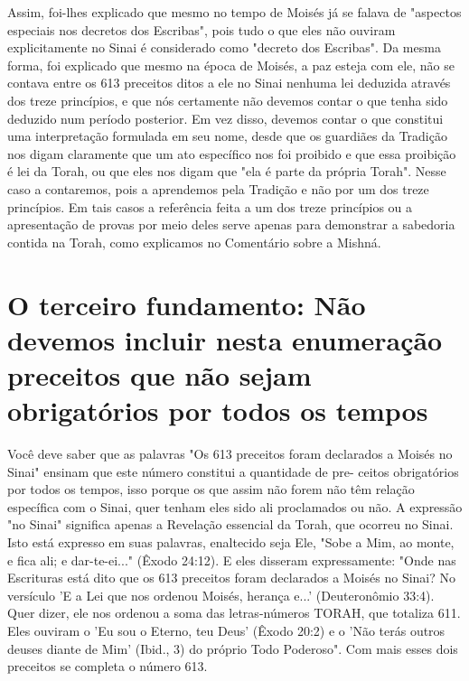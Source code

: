 \begin{itemize}
\begin{enumrate}
Assim, foi-lhes explicado que mesmo no tempo de Moisés já se fala­va de
"aspectos especiais nos decretos dos Escribas", pois tudo o que eles não
ouviram explicitamente no Sinai é considerado como "decreto dos
Escribas". Da mesma forma, foi explicado que mesmo na época de Moisés, a
paz esteja com ele, não se contava entre os 613 preceitos ditos a ele no
Sinai nenhuma lei deduzida através dos treze princípios, e que nós
certamente não devemos contar o que tenha sido deduzido num período
posterior. Em vez disso, deve­mos contar o que constitui uma
interpretação formulada em seu nome, desde que os guardiães da Tradição
nos digam claramente que um ato específico nos foi proibido e que essa
proibição é lei da Torah, ou que eles nos digam que "ela é parte da
própria Torah". Nesse caso a contaremos, pois a aprendemos pela Tradição
e não por um dos treze princípios. Em tais casos a referência feita a um
dos treze princípios ou a apresentação de provas por meio deles serve
apenas para demonstrar a sabedoria contida na Torah, como explicamos no
Co­mentário sobre a Mishná.

\chapter{O terceiro fundamento: Não devemos incluir nesta enumeração preceitos que não sejam
obrigatórios por todos os tempos}

Você deve saber que as palavras "Os 613 preceitos foram declara­dos a
Moisés no Sinai" ensinam que este número constitui a quantidade de pre-
ceitos obrigatórios por todos os tempos, isso porque os que assim não
forem não têm relação específica com o Sinai, quer tenham eles sido ali
proclamados ou não. A expressão "no Sinai" significa apenas a Revelação
essencial da Torah, que ocorreu no Sinai. Isto está expresso em suas
palavras, enaltecido seja Ele, "Sobe a Mim, ao monte, e fica ali; e
dar-te-ei..." (Êxodo 24:12). E eles disseram expressamente: "Onde nas
Escrituras está dito que os 613 preceitos foram de­clarados a Moisés no
Sinai? No versículo 'E a Lei que nos ordenou Moisés, heran­ça e...'
(Deuteronômio 33:4). Quer dizer, ele nos ordenou a soma das
letras-nú­meros TORAH, que totaliza 611. Eles ouviram o 'Eu sou o
Eterno, teu Deus' (Êxo­do 20:2) e o 'Não terás outros deuses diante de
Mim' (Ibid., 3) do próprio Todo Poderoso". Com mais esses dois preceitos
se completa o número 613.


\end{enumrate}
\end{itemize}
